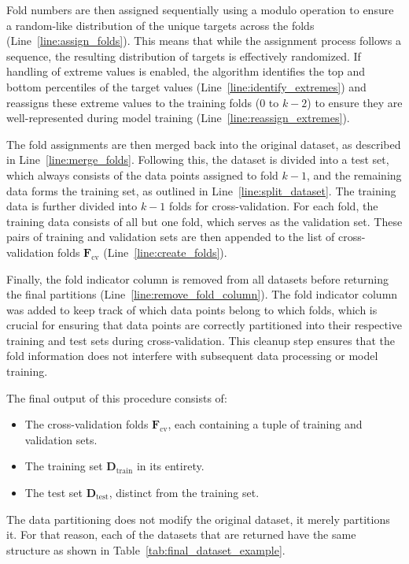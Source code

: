 Fold numbers are then assigned sequentially using a modulo operation to ensure a random-like distribution of the unique targets across the folds (Line~\ref{line:assign_folds}).
This means that while the assignment process follows a sequence, the resulting distribution of targets is effectively randomized.
If handling of extreme values is enabled, the algorithm identifies the top and bottom percentiles of the target values (Line~\ref{line:identify_extremes}) and reassigns these extreme values to the training folds (0 to \( k-2 \)) to ensure they are well-represented during model training (Line~\ref{line:reassign_extremes}).

The fold assignments are then merged back into the original dataset, as described in Line~\ref{line:merge_folds}.
Following this, the dataset is divided into a test set, which always consists of the data points assigned to fold \( k-1 \), and the remaining data forms the training set, as outlined in Line~\ref{line:split_dataset}.
The training data is further divided into \( k-1 \) folds for cross-validation.
For each fold, the training data consists of all but one fold, which serves as the validation set.
These pairs of training and validation sets are then appended to the list of cross-validation folds \(\mathbf{F}_\text{cv}\) (Line~\ref{line:create_folds}).

Finally, the fold indicator column is removed from all datasets before returning the final partitions (Line~\ref{line:remove_fold_column}).
The fold indicator column was added to keep track of which data points belong to which folds, which is crucial for ensuring that data points are correctly partitioned into their respective training and test sets during cross-validation. 
This cleanup step ensures that the fold information does not interfere with subsequent data processing or model training.

The final output of this procedure consists of:
\begin{itemize}
    \item The cross-validation folds \(\mathbf{F}_\text{cv}\), each containing a tuple of training and validation sets.
    \item The training set \(\mathbf{D}_\text{train}\) in its entirety.
    \item The test set \(\mathbf{D}_\text{test}\), distinct from the training set.
\end{itemize}

The data partitioning does not modify the original dataset, it merely partitions it.
For that reason, each of the datasets that are returned have the same structure as shown in Table~\ref{tab:final_dataset_example}.

